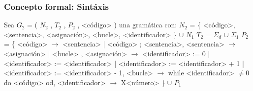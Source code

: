\documentclass[xcolor=table]{beamer}
\begin{document}
\begin{frame}[fragile]\frametitle{Concepto formal: Sintáxis} \footnotesize  


Sea $G_2$ = ( $N_2$ , $T_2$ , $P_2$ , <código> ) una gramática con:\hfill \break
\vspace{0.1cm}
$N_2$ = \{ <código>, <sentencia>, <asignación>, <bucle>, <identificador> \} $\cup$ $N_1$ \break
\vspace{0.1cm}
$T_2$ = $\Sigma_d$ $\cup$ $\Sigma_1$\break
\vspace{0.1cm}
$P_2$ = \{ <código> $\rightarrow$ <sentencia>\break
\vspace{0.1cm}
\hspace{2.1cm} | <código> ; <sentencia>,\break
\vspace{0.1cm}
\hspace{0.8cm}<sentencia> $\rightarrow$ <asignación>\break
\vspace{0.1cm}
\hspace{2.5cm} | <bucle> ,\break
\vspace{0.1cm}
\hspace{0.8cm}<asignación> $\rightarrow$ <identificador> := 0\break
\vspace{0.1cm}
\hspace{2.8cm}| <identificador> := <identificador>\break
\vspace{0.1cm}
\hspace{2.8cm}| <identificador> := <identificador> + 1\break
\vspace{0.1cm}
\hspace{2.8cm}| <identificador> := <identificador> - 1,\break
\vspace{0.1cm}
\hspace{0.8cm}<bucle> $\rightarrow$ while <identificador> $\neq 0$ do <código> od,\break
\vspace{0.1cm}
\hspace{0.8cm}<identificador> $\rightarrow$ X<número> \} $\cup$ $P_1$

\end{frame}
\end{document}
